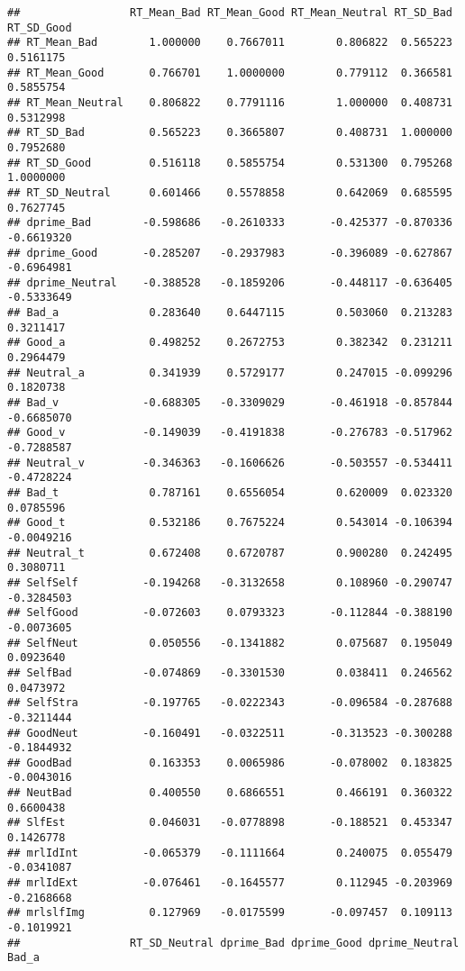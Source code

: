 \documentclass[man]{apa6}
\begin{document}
\begin{verbatim}
##                 RT_Mean_Bad RT_Mean_Good RT_Mean_Neutral RT_SD_Bad RT_SD_Good
## RT_Mean_Bad        1.000000    0.7667011        0.806822  0.565223  0.5161175
## RT_Mean_Good       0.766701    1.0000000        0.779112  0.366581  0.5855754
## RT_Mean_Neutral    0.806822    0.7791116        1.000000  0.408731  0.5312998
## RT_SD_Bad          0.565223    0.3665807        0.408731  1.000000  0.7952680
## RT_SD_Good         0.516118    0.5855754        0.531300  0.795268  1.0000000
## RT_SD_Neutral      0.601466    0.5578858        0.642069  0.685595  0.7627745
## dprime_Bad        -0.598686   -0.2610333       -0.425377 -0.870336 -0.6619320
## dprime_Good       -0.285207   -0.2937983       -0.396089 -0.627867 -0.6964981
## dprime_Neutral    -0.388528   -0.1859206       -0.448117 -0.636405 -0.5333649
## Bad_a              0.283640    0.6447115        0.503060  0.213283  0.3211417
## Good_a             0.498252    0.2672753        0.382342  0.231211  0.2964479
## Neutral_a          0.341939    0.5729177        0.247015 -0.099296  0.1820738
## Bad_v             -0.688305   -0.3309029       -0.461918 -0.857844 -0.6685070
## Good_v            -0.149039   -0.4191838       -0.276783 -0.517962 -0.7288587
## Neutral_v         -0.346363   -0.1606626       -0.503557 -0.534411 -0.4728224
## Bad_t              0.787161    0.6556054        0.620009  0.023320  0.0785596
## Good_t             0.532186    0.7675224        0.543014 -0.106394 -0.0049216
## Neutral_t          0.672408    0.6720787        0.900280  0.242495  0.3080711
## SelfSelf          -0.194268   -0.3132658        0.108960 -0.290747 -0.3284503
## SelfGood          -0.072603    0.0793323       -0.112844 -0.388190 -0.0073605
## SelfNeut           0.050556   -0.1341882        0.075687  0.195049  0.0923640
## SelfBad           -0.074869   -0.3301530        0.038411  0.246562  0.0473972
## SelfStra          -0.197765   -0.0222343       -0.096584 -0.287688 -0.3211444
## GoodNeut          -0.160491   -0.0322511       -0.313523 -0.300288 -0.1844932
## GoodBad            0.163353    0.0065986       -0.078002  0.183825 -0.0043016
## NeutBad            0.400550    0.6866551        0.466191  0.360322  0.6600438
## SlfEst             0.046031   -0.0778898       -0.188521  0.453347  0.1426778
## mrlIdInt          -0.065379   -0.1111664        0.240075  0.055479 -0.0341087
## mrlIdExt          -0.076461   -0.1645577        0.112945 -0.203969 -0.2168668
## mrlslfImg          0.127969   -0.0175599       -0.097457  0.109113 -0.1019921
##                 RT_SD_Neutral dprime_Bad dprime_Good dprime_Neutral     Bad_a

\end{verbatim}
\end{document}
